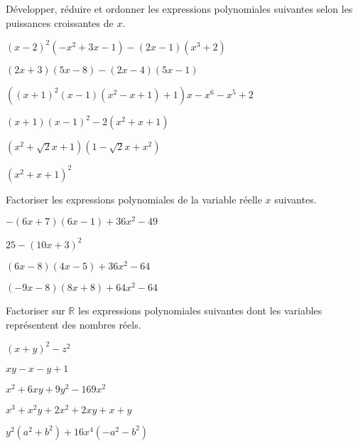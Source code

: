 \documentclass[a4paper, 11pt]{article}
\begin{document}
\begin{exercice}
	Développer, réduire et ordonner les expressions polynomiales suivantes selon les puissances croissantes de $x$.
	\begin{itemize}[label=$\bullet$]
		\begin{minipage}[t]{0.55\textwidth}
			\item $(x-2)^2\left(-x^2+3 x-1\right)-(2 x-1)\left(x^3+2\right)$
			\item  $(2 x+3)(5 x-8)-(2 x-4)(5 x-1)$
			\item  $\left((x+1)^2(x-1)\left(x^2-x+1\right)+1\right) x-x^6-x^5+2$
		\end{minipage}
		\begin{minipage}[t]{0.45\textwidth}
			\item  $(x+1)(x-1)^2-2\left(x^2+x+1\right)$
			\item $\left(x^2+\sqrt{2} x+1\right)\left(1-\sqrt{2} x+x^2\right)$
			\item $\left(x^2+x+1\right)^2$
		\end{minipage}
	\end{itemize}
\end{exercice}

\begin{exercice}
	Factoriser les expressions polynomiales de la variable réelle $x$ suivantes.
	\begin{itemize}[label=$\bullet$]
		\begin{minipage}[t]{0.55\textwidth}
			\item$-(6 x+7)(6 x-1)+36 x^2-49$
			\item $25-(10 x+3)^2$
		\end{minipage}
		\begin{minipage}[t]{0.45\textwidth}
			\item  $(6 x-8)(4 x-5)+36 x^2-64$
			\item $(-9 x-8)(8 x+8)+64 x^2-64$
		\end{minipage}
	\end{itemize}

\end{exercice}

\begin{exercice}
	Factoriser sur $\mathbb{R}$ les expressions polynomiales suivantes dont les variables représentent des nombres réels.
	\begin{itemize}[label=$\bullet$]
		\begin{minipage}[t]{0.55\textwidth}
			\item$(x+y)^2-z^2$
			\item  $x y-x-y+1$
			\item $x^2+6 x y+9 y^2-169 x^2$
		\end{minipage}
		\begin{minipage}[t]{0.45\textwidth}
			\item   $x^3+x^2 y+2 x^2+2 x y+x+y$
			\item$y^2\left(a^2+b^2\right)+16 x^4\left(-a^2-b^2\right) $
		\end{minipage}
	\end{itemize}

\end{exercice}
\end{document}
